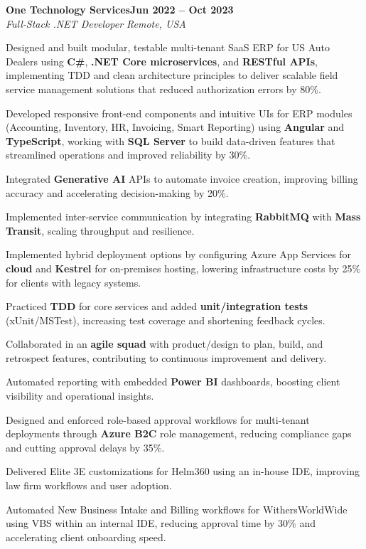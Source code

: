 \documentclass[letterpaper,10pt]{article}
\newcommand{\headingBf}[2]{
  \hspace{10pt}\textbf{#1}\hfill\textbf{#2}\\
}
\newcommand{\headingIt}[2]{
  \hspace{10pt}\textit{#1}\hfill\textit{#2}\\
}
\newenvironment{resume_list}{
  \vspace{-7pt}
  \begin{itemize}[itemsep=-2px, parsep=1pt, leftmargin=30pt]
}{
  \end{itemize}
}
\begin{document}
\headingBf{One Technology Services}{Jun 2022 -- Oct 2023}
\headingIt{Full-Stack .NET Developer \hfill Remote, USA}{}
\begin{resume_list}
    \item Designed and built modular, testable multi-tenant SaaS ERP for US Auto Dealers using \textbf{C\#}, \textbf{.NET Core microservices}, and \textbf{RESTful APIs}, implementing TDD and clean architecture principles to deliver scalable field service management solutions that reduced authorization errors by 80\%.
    \item Developed responsive front-end components and intuitive UIs for ERP modules (Accounting, Inventory, HR, Invoicing, Smart Reporting) using \textbf{Angular} and \textbf{TypeScript}, working with \textbf{SQL Server} to build data-driven features that streamlined operations and improved reliability by 30\%.
    \item Integrated \textbf{Generative AI} APIs to automate invoice creation, improving billing accuracy and accelerating decision-making by 20\%.
    \item Implemented inter-service communication by integrating \textbf{RabbitMQ} with \textbf{Mass Transit}, scaling throughput and resilience.
    \item Implemented hybrid deployment options by configuring Azure App Services for \textbf{cloud} and \textbf{Kestrel} for on-premises hosting, lowering infrastructure costs by 25\% for clients with legacy systems.
    \item Practiced \textbf{TDD} for core services and added \textbf{unit/integration tests} (xUnit/MSTest), increasing test coverage and shortening feedback cycles.
    \item Collaborated in an \textbf{agile squad} with product/design to plan, build, and retrospect features, contributing to continuous improvement and delivery.
    \item Automated reporting with embedded \textbf{Power BI} dashboards, boosting client visibility and operational insights.   
    \item Designed and enforced role-based approval workflows for multi-tenant deployments through \textbf{Azure B2C} role management, reducing compliance gaps and cutting approval delays by 35\%.
    \item Delivered Elite 3E customizations for Helm360 using an in-house IDE, improving law firm workflows and user adoption.
    \item Automated New Business Intake and Billing workflows for WithersWorldWide using VBS within an internal IDE, reducing approval time by 30\% and accelerating client onboarding speed.
\end{resume_list}
\end{document}
